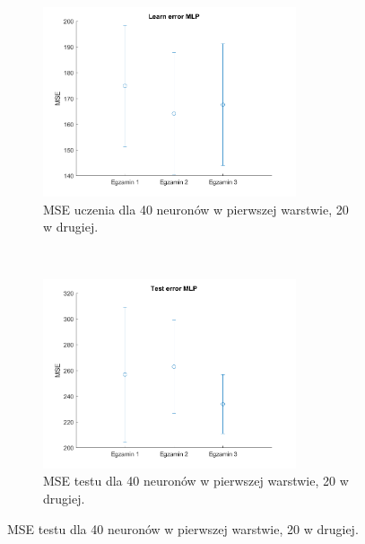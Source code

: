 \documentclass[12pt]{article}
\begin{document}
\begin{figure}[H]
\centering
\begin{subfigure}[t]{0.48\textwidth} 
\centering
\includegraphics[height=2.2in]{radbas_tansig_purelin20_learn.png}
\caption{MSE uczenia dla  40 neuronów w pierwszej warstwie, 20 w drugiej.}
\end{subfigure}
~~
\begin{subfigure}[t]{0.48\textwidth} 
\centering
\includegraphics[height=2.2in]{radbas_tansig_purelin20_test.png}
\caption{MSE testu dla  40 neuronów w pierwszej warstwie, 20 w drugiej.}
\end{subfigure}


\end{figure}
\end{document}
